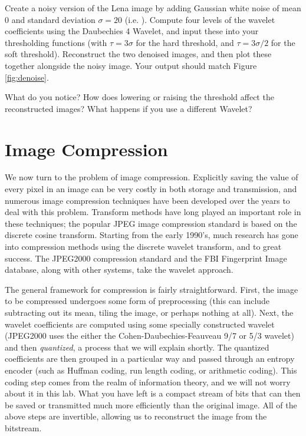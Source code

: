 \begin{problem}
Create a noisy version of the Lena image by adding Gaussian
white noise of mean 0 and standard deviation $\sigma = 20$ (i.e. ).
Compute four levels of the wavelet coefficients using the Daubechies 4 Wavelet, 
and input these into your
thresholding functions (with $\tau = 3\sigma$ for the hard threshold,
and $\tau = 3\sigma/2$ for the soft threshold). Reconstruct the
two denoised images, and then plot these together alongside the
noisy image. Your output should match Figure \ref{fig:denoise}.

What do you notice? How does lowering or raising the
threshold affect the reconstructed images? What happens if you use
a different Wavelet?
\end{problem}

\section*{Image Compression}
We now turn to the problem of image compression. Explicitly saving
the value of every pixel in an image can be very costly in both
storage and transmission, and numerous image compression techniques
have been developed over the years to deal with this problem.
Transform methods have long played an important role in these
techniques; the popular JPEG image compression standard is based on
the discrete cosine transform. Starting from the early 1990's, much
research has gone into compression methods using the discrete wavelet
transform, and to great success. The JPEG2000 compression standard
and the FBI Fingerprint Image database, along with other systems,
take the wavelet approach.

The general framework for compression is fairly straightforward. First,
the image to be compressed undergoes some form of preprocessing (this
can include subtracting out its mean, tiling the image, or perhaps
nothing at all). Next, the wavelet coefficients are computed using some
specially constructed wavelet (JPEG2000 uses the either the
Cohen-Daubechies-Feauveau 9/7 or 5/3 wavelet) and then \textit{quantized},
 a process that we will explain shortly. The quantized coefficients are
 then grouped in a particular way and passed through an entropy encoder
 (such as Huffman coding, run length coding, or arithmetic coding). This
 coding step comes from the realm of information theory, and we will not
 worry about it in this lab. What you have left is a compact stream of bits
 that can then be saved or transmitted much more efficiently than the
 original image. All of the above steps are invertible, allowing us to
 reconstruct the image from the bitstream.

